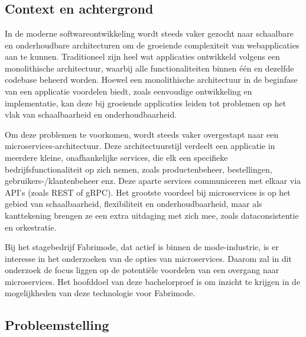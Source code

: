 
\chapter{}%
\label{ch:inleiding}

\section{Context en achtergrond}

In de moderne softwareontwikkeling wordt steeds vaker gezocht naar schaalbare en onderhoudbare architecturen om de groeiende complexiteit van webapplicaties aan te kunnen. Traditioneel zijn heel wat applicaties ontwikkeld volgens een monolithische architectuur, waarbij alle functionaliteiten binnen één en dezelfde codebase beheerd worden. Hoewel een monolithische architectuur in de beginfase van een applicatie voordelen biedt, zoals eenvoudige ontwikkeling en implementatie, kan deze bij groeiende applicaties leiden tot problemen op het vlak van schaalbaarheid en onderhoudbaarheid.

Om deze problemen te voorkomen, wordt steeds vaker overgestapt naar een microservices\--architectuur. Deze architectuurstijl verdeelt een applicatie in meerdere kleine, onafhankelijke services, die elk een specifieke bedrijfsfunctionaliteit op zich nemen, zoals productenbeheer, bestellingen, gebruikers-/klantenbeheer enz. Deze aparte services communiceren met elkaar via API's (zoals REST of gRPC). Het grootste voordeel bij microservices is op het gebied van schaalbaarheid, flexibiliteit en onderhoudbaarheid, maar als kanttekening brengen ze een extra uitdaging met zich mee, zoals dataconsistentie en orkestratie.

Bij het stagebedrijf Fabrimode, dat actief is binnen de mode-industrie, is er interesse in het onderzoeken van de opties van microservices. Daarom zal in dit onderzoek de focus liggen op de potentiële voordelen van een overgang naar microservices. Het hoofddoel van deze bachelorproef is om inzicht te krijgen in de mogelijkheden van deze technologie voor Fabrimode.

\section{Probleemstelling}

